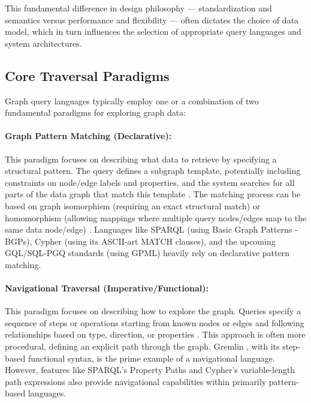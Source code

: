\documentclass[sigconf,natbib=false]{acmart}
\begin{document}
This fundamental difference in design philosophy --- standardization and semantics versus performance and flexibility --- often dictates the choice of data model, which in turn influences the selection of appropriate query languages and system architectures.

\subsection{Core Traversal Paradigms}
Graph query languages typically employ one or a combination of two fundamental paradigms for exploring graph data:

\paragraph{Graph Pattern Matching (Declarative):}
This paradigm focuses on describing what data to retrieve by specifying a structural pattern.
The query defines a subgraph template, potentially including constraints on node/edge labels and properties, and the system searches for all parts of the data graph that match this template \cite{deutsch2022GraphPatternMatching}.
The matching process can be based on graph isomorphism (requiring an exact structural match) or homomorphism (allowing mappings where multiple query nodes/edges map to the same data node/edge) \cite{angles2018FoundationsModernQuery}.
Languages like SPARQL (using Basic Graph Patterns - BGPs), Cypher (using its ASCII-art MATCH clauses), and the upcoming GQL/SQL-PGQ standards \cite{ISOIECSQL,ISOIECGQL}
(using GPML) heavily rely on declarative pattern matching.

\paragraph{Navigational Traversal (Imperative/Functional):}
This paradigm focuses on describing how to explore the graph.
Queries specify a sequence of steps or operations starting from known nodes or edges and following relationships based on type, direction, or properties \cite{TinkerPopDocumentation}.
This approach is often more procedural, defining an explicit path through the graph.
Gremlin \cite{ApacheTinkerPopGremlin}, with its step-based functional syntax, is the prime example of a navigational language.
However, features like SPARQL's Property Paths \cite{SPARQL11Property} and Cypher's variable-length path expressions \cite{VariablelengthPatternsCypher} also provide navigational capabilities within primarily pattern-based languages.
\end{document}

